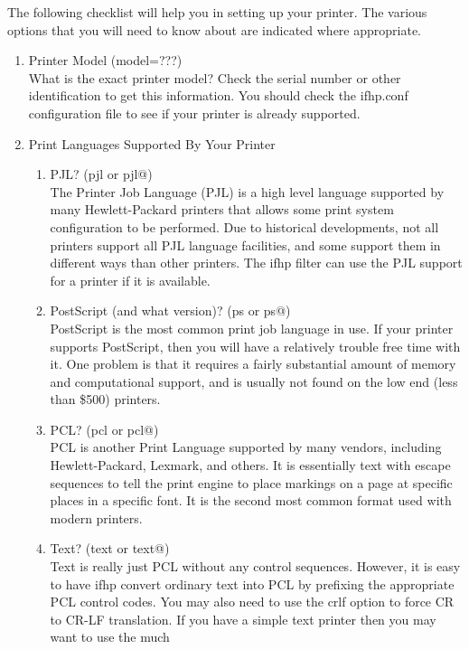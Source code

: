 \documentclass[a4paper]{article}
\begin{document}
The following checklist will help you in setting up your printer.
The various options that you will need to know about are indicated
where appropriate.
\begin{enumerate}
\item Printer Model ({\ttfamily model=???})\\ 
What is the exact printer model?
Check the serial number or other identification to get this information.
You should check the {\ttfamily ifhp.conf}
configuration file to see if your printer is already supported.
\item Print Languages Supported By Your Printer
\begin{enumerate}
\item PJL? ({\ttfamily pjl} or {\ttfamily pjl@})\\ 
The Printer Job Language (PJL) is a high level language supported by many Hewlett-Packard
printers that allows some print system configuration to be performed.
Due to historical developments,
not all printers support all PJL language facilities,
and some support them in different ways than other printers.
The {\ttfamily ifhp} filter can use the PJL support for a printer if it is available.
\item PostScript (and what version)?  ({\ttfamily ps} or {\ttfamily ps@})\\ 
PostScript is the most common print job language in use.
If your printer supports PostScript,
then you will have a relatively trouble free time with it. 
One problem is that it requires a fairly substantial amount of
memory and computational support,
and is usually not found on the low end (less than \$500) printers.
\item PCL? ({\ttfamily pcl} or {\ttfamily pcl@})\\ 
PCL is another Print Language supported by
many vendors, including Hewlett-Packard,
Lexmark, and others.
It is essentially text with escape sequences to tell the print engine
to place markings on a page at specific places in a specific font.
It is the second most common format used with modern printers.
\item Text? ({\ttfamily text} or {\ttfamily text@})\\ 
Text is really just PCL without any control sequences.
However, it is easy to have {\ttfamily ifhp} convert ordinary text into PCL
by prefixing the appropriate PCL control codes.
You may also need to use the {\ttfamily crlf} option to force
{\ttfamily CR} to {\ttfamily CR-LF} translation.
If you have a simple text printer then you may want to use the much

\end{enumerate}
\end{enumerate}
\end{document}
